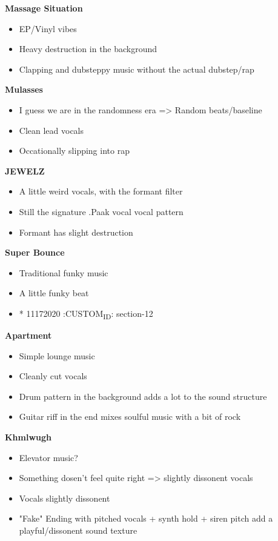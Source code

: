 \documentclass[letterpaper]{article}
\begin{document}
\textbf{Massage Situation}

\begin{itemize}
\item EP/Vinyl vibes
\item Heavy destruction in the background
\item Clapping and dubsteppy music without the actual dubstep/rap
\end{itemize}

\textbf{Mulasses}

\begin{itemize}
\item I guess we are in the randomness era => Random beats/baseline
\item Clean lead vocals
\item Occationally slipping into rap
\end{itemize}

\textbf{JEWELZ}

\begin{itemize}
\item A little weird vocals, with the formant filter
\item Still the signature .Paak vocal vocal pattern
\item Formant has slight destruction
\end{itemize}

\textbf{Super Bounce}

\begin{itemize}
\item Traditional funky music

\item A little funky beat

\item * 11172020
:CUSTOM\textsubscript{ID}: section-12
\end{itemize}

\textbf{Apartment}

\begin{itemize}
\item Simple lounge music
\item Cleanly cut vocals
\item Drum pattern in the background adds a lot to the sound structure
\item Guitar riff in the end mixes soulful music with a bit of rock
\end{itemize}

\textbf{Khmlwugh}

\begin{itemize}
\item Elevator music?
\item Something dosen't feel quite right => slightly dissonent vocals
\item Vocals slightly dissonent
\item "Fake" Ending with pitched vocals + synth hold + siren pitch add a
playful/dissonent sound texture
\end{itemize}
\end{document}
